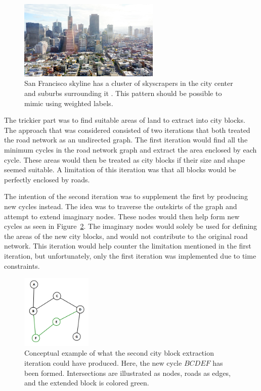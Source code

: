 \begin{figure}[h!]
  \centering
  \includegraphics[width=0.6\textwidth]{figure/san_francisco.jpg}

  \caption{San Francisco skyline has a cluster of skyscrapers in the city center and suburbs surrounding it \cite{san_francisco_img}. This pattern should be possible to mimic using weighted labels.}
  \label{fig:san_francisco}
\end{figure}

The trickier part was to find suitable areas of land to extract into city blocks.
The approach that was considered consisted of two iterations that both treated the road network as an undirected graph.
The first iteration would find all the minimum cycles in the road network graph and extract the area enclosed by each cycle.
These areas would then be treated as city blocks if their size and shape seemed suitable.
A limitation of this iteration was that all blocks would be perfectly enclosed by roads.

The intention of the second iteration was to supplement the first by producing new cycles instead.
The idea was to traverse the outskirts of the graph and attempt to extend imaginary nodes.
These nodes would then help form new cycles as seen in Figure~\ref{fig:extend_block}.
The imaginary nodes would solely be used for defining the areas of the new city blocks, and would not contribute to the original road network.
This iteration would help counter the limitation mentioned in the first iteration, but unfortunately, only the first iteration was implemented due to time constraints.

\begin{figure}[h!]
  \centering
  \includegraphics[width=0.3\textwidth]{figure/extend_block.png}

  \caption{Conceptual example of what the second city block extraction iteration could have produced. Here, the new cycle $BCDEF$ has been formed. Intersections are illustrated as nodes, roads as edges, and the extended block is colored green.}
  \label{fig:extend_block}
\end{figure}

